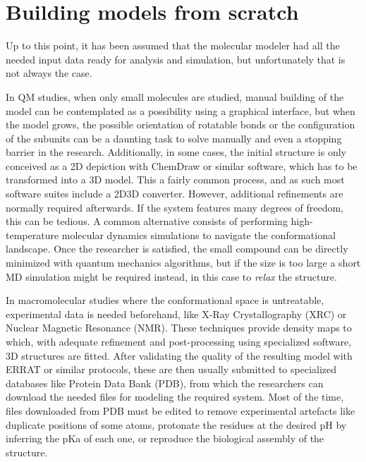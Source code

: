 \section{Building models from scratch}
\label{section:buildingmodels}
Up to this point, it has been assumed that the molecular modeler had all the needed input data ready for analysis and simulation, but unfortunately that is not always the case.

In QM studies, when only small molecules are studied, manual building of the model can be contemplated as a possibility using a graphical interface,\cite{gaussview,avogadro} but when the model grows, the possible orientation of rotatable bonds or the configuration of the subunits can be a daunting task to solve manually and even a stopping barrier in the research. Additionally, in some cases, the initial structure is only conceived as a 2D depiction with ChemDraw or similar software, which has to be transformed into a 3D model. This a fairly common process, and as such most software suites include a 2D\textrightarrow 3D converter. However, additional refinements are normally required afterwards. If the system features many degrees of freedom, this can be tedious. A common alternative consists of performing high-temperature molecular dynamics simulations to navigate the conformational landscape. Once the researcher is satisfied, the small compound can be directly minimized with quantum mechanics algorithms, but if the size is too large a short MD simulation might be required instead, in this case to \textit{relax} the structure.

In macromolecular studies where the conformational space is untreatable, experimental data is needed beforehand, like X-Ray Crystallography (XRC) or Nuclear Magnetic Resonance (NMR). These techniques provide density maps to which, with adequate refinement and post-processing using specialized software,\cite{ccp4,phenix} 3D structures are fitted. After validating the quality of the resulting model with ERRAT\cite{errat} or similar protocols, these are then usually submitted to specialized databases like Protein Data Bank (PDB),\cite{proteindatabank} from which the researchers can download the needed files for modeling the required system. Most of the time, files downloaded from PDB must be edited to remove experimental artefacts like duplicate positions of some atoms, protonate the residues at the desired pH by inferring the pKa of each one,\cite{word1999asparagine,propka,addh} or reproduce the biological assembly of the structure.\cite{bietz2016siena,sym}


